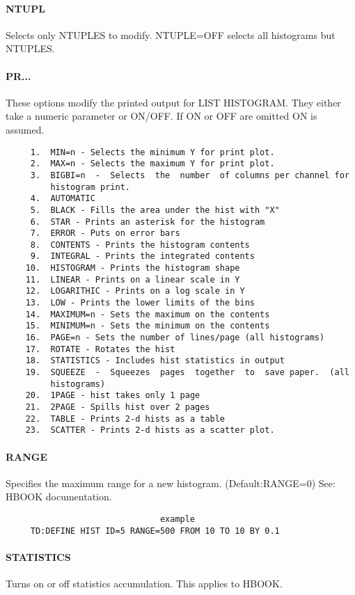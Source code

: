 \paragraph{NTUPL        }
Selects  only  NTUPLES  to modify.  NTUPLE=OFF selects all histograms
but NTUPLES.  
\paragraph{PR...        }
These  options  modify  the  printed output for LIST HISTOGRAM.  They
either take a numeric parameter or ON/OFF.  If ON or OFF are  omitted
ON is assumed.  
\begin{verbatim}
     1.  MIN=n - Selects the minimum Y for print plot.  
     2.  MAX=n - Selects the maximum Y for print plot.  
     3.  BIGBI=n  -  Selects  the  number  of columns per channel for
         histogram print.  
     4.  AUTOMATIC 
     5.  BLACK - Fills the area under the hist with "X" 
     6.  STAR - Prints an asterisk for the histogram 
     7.  ERROR - Puts on error bars 
     8.  CONTENTS - Prints the histogram contents 
     9.  INTEGRAL - Prints the integrated contents 
    10.  HISTOGRAM - Prints the histogram shape 
    11.  LINEAR - Prints on a linear scale in Y 
    12.  LOGARITHIC - Prints on a log scale in Y 
    13.  LOW - Prints the lower limits of the bins 
    14.  MAXIMUM=n - Sets the maximum on the contents 
    15.  MINIMUM=n - Sets the minimum on the contents 
    16.  PAGE=n - Sets the number of lines/page (all histograms) 
    17.  ROTATE - Rotates the hist 
    18.  STATISTICS - Includes hist statistics in output 
    19.  SQUEEZE  -  Squeezes  pages  together  to  save paper.  (all
         histograms) 
    20.  1PAGE - hist takes only 1 page 
    21.  2PAGE - Spills hist over 2 pages 
    22.  TABLE - Prints 2-d hists as a table 
    23.  SCATTER - Prints 2-d hists as a scatter plot.  
\end{verbatim}
\paragraph{RANGE       }
Specifies  the  maximum range for a new histogram.  (Default:RANGE=0)
See:  HBOOK documentation.  

\begin{verbatim}
                               example
     TD:DEFINE HIST ID=5 RANGE=500 FROM 10 TO 10 BY 0.1 
\end{verbatim}
\paragraph{STATISTICS   }
Turns on or off statistics accumulation.  This applies to HBOOK.  
